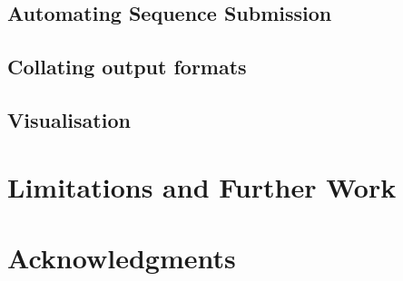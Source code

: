 \documentclass[fleqn,10pt]{SelfArx} %
\begin{document}
\subsection{Automating Sequence Submission}
\subsection{Collating output formats}
\subsection{Visualisation}
\section{Limitations and Further Work}
\section*{Acknowledgments}





\end{document}
